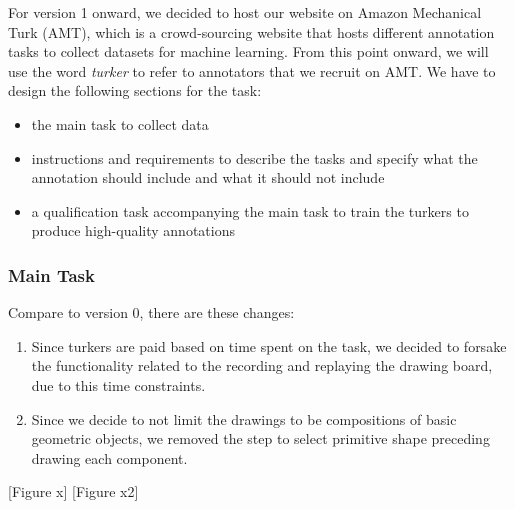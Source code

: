 For version 1 onward, we decided to host our website on Amazon Mechanical Turk (AMT), which is a crowd-sourcing website that hosts different annotation tasks to collect datasets for machine learning. From this point onward, we will use the word \textit{turker} to refer to annotators that we recruit on AMT. We have to design the following sections for the task: 
\begin{itemize}
    \item the main task to collect data
    \item instructions and requirements to describe the tasks and specify what the annotation should include and what it should not include
    \item a qualification task accompanying the main task to train the turkers to produce high-quality annotations
\end{itemize}

\subsubsection{Main Task}
Compare to version 0, there are these changes: 
\begin{enumerate}
    \item Since turkers are paid based on time spent on the task, we decided to forsake the functionality related to the recording and replaying the drawing board, due to this time constraints.
    \item Since we decide to not limit the drawings to be compositions of basic geometric objects, we removed the step to select primitive shape preceding drawing each component.
\end{enumerate}

[Figure x]
[Figure x2]

